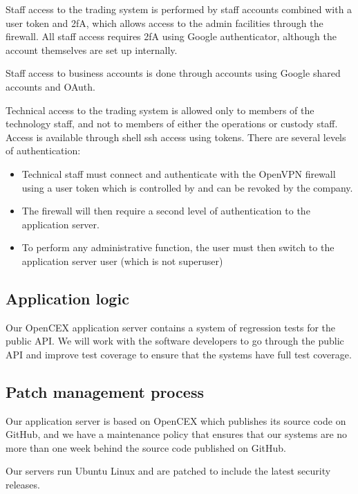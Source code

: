 Staff access to the trading system is performed by staff accounts
combined with a user token and 2fA, which allows access to the admin
facilities through the firewall.  All staff access requires 2fA using
Google authenticator, although the account themselves are set up
internally.

Staff access to business accounts is done through accounts using
Google shared accounts and OAuth.

Technical access to the trading system is allowed only to members of
the technology staff, and not to members of either the operations or
custody staff.  Access is available through shell ssh access using
tokens.  There are several levels of authentication:

\begin{itemize}
\item Technical staff must connect and authenticate with the OpenVPN
firewall using a user token which is controlled by and can be revoked
by the company.
\item The firewall will then require a second level of authentication to
the application server.
\item To perform any administrative function, the user must then switch
  to the application server user (which is not superuser)
\end{itemize}


\subsection{Application logic}
Our OpenCEX application server contains a system of regression tests for the
public API.  We will work with the software developers to go through
the public API and improve test coverage to ensure that the systems
have full test coverage.

\subsection{Patch management process}

Our application server is based on OpenCEX which publishes its
source code on GitHub, and we have a maintenance policy that ensures
that our systems are no more than one week behind the source code
published on GitHub.

Our servers run Ubuntu Linux and are patched to include the latest
security releases.

